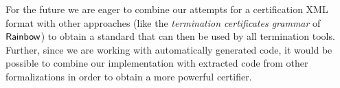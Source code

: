 \documentclass[a4paper,final]{easychair}
\theoremstyle{definition}
\newcommand\formatID[1]{\ensuremath{{\sf#1}}}
\newcommand\Rainbow{\formatID{Rainbow}}
\begin{document}
For the future we are eager to combine our attempts for a certification XML
format with other approaches (like the \emph{termination certificates grammar} of
\Rainbow) to obtain a standard that can then be used by all termination tools.
Further, since we are working with automatically generated code, it would be
possible to combine our implementation with extracted code from other
formalizations in order to obtain a more powerful certifier.



\end{document}
